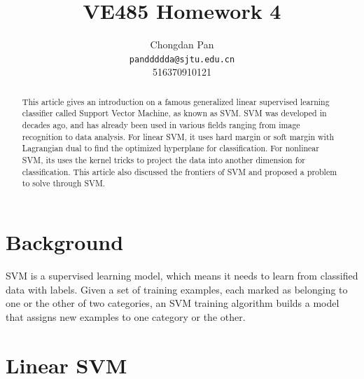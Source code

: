 \documentclass{article}
\title{VE485 Homework 4}
\author{Chongdan Pan 
\\\texttt{panddddda@sjtu.edu.cn}
\\516370910121 
}
\begin{document}
\maketitle
\begin{abstract}
    This article gives an introduction on a famous generalized linear supervised learning classifier called Support Vector Machine, as known as SVM. SVM was developed in decades ago, and has already been used in various fields ranging from image recognition to data analysis. For linear SVM, it uses hard margin or soft margin with Lagrangian dual to find the optimized hyperplane for classification. For nonlinear SVM, its uses the kernel tricks to project the data into another dimension for classification. This article also discussed the frontiers of SVM and proposed a problem to solve through SVM.
\end{abstract}
\section{Background}
SVM is a supervised learning model, which means it needs to learn from classified data with labels. Given a set of training examples, each marked as belonging to one or the other of two categories, an SVM training algorithm builds a model that assigns new examples to one category or the other\cite{1}.
\section{Linear SVM} 
\end{document}
